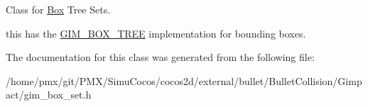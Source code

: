 Class for \hyperlink{classBox}{Box} Tree Sets. 

this has the \hyperlink{classGIM__BOX__TREE}{G\+I\+M\+\_\+\+B\+O\+X\+\_\+\+T\+R\+EE} implementation for bounding boxes. 

The documentation for this class was generated from the following file\+:\begin{DoxyCompactItemize}
\item 
/home/pmx/git/\+P\+M\+X/\+Simu\+Cocos/cocos2d/external/bullet/\+Bullet\+Collision/\+Gimpact/gim\+\_\+box\+\_\+set.\+h\end{DoxyCompactItemize}
